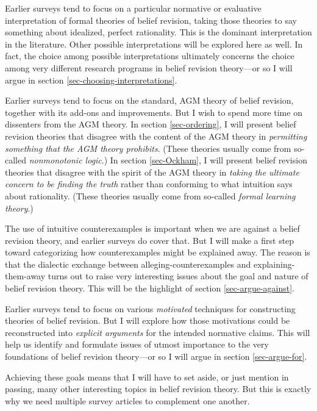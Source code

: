 	\im Earlier surveys tend to focus on a particular normative or evaluative interpretation of formal theories of belief revision, taking those theories to say something about idealized, perfect rationality. This is the dominant interpretation in the literature. Other possible interpretations will be explored here as well. In fact, the choice among possible interpretations ultimately concerns the choice among very different research programs in belief revision theory---or so I will argue in section \ref{sec-choosing-interpretations}. 

	\im Earlier surveys tend to focus on the standard, AGM theory of belief revision, together with its add-ons and improvements. But I wish to spend more time on dissenters from the AGM theory. In section \ref{sec-ordering}, I will present belief revision theories that disagree with the content of the AGM theory in {\em permitting something that the AGM theory prohibits}. (These theories usually come from so-called {\em nonmonotonic logic}.) In section \ref{sec-Ockham}, I will present belief revision theories that disagree with the spirit of the AGM theory in {\em taking the ultimate concern to be finding the truth} rather than conforming to what intuition says about rationality. (These theories usually come from so-called {\em formal learning theory}.) 

	\im The use of intuitive counterexamples is important when we are against a belief revision theory, and earlier surveys do cover that. But I will make a first step toward categorizing how counterexamples might be explained away. The reason is that the dialectic exchange between alleging-counterexamples and explaining-them-away turns out to raise very interesting issues about the goal and nature of belief revision theory. This will be the highlight of section \ref{sec-argue-against}.  

	\im Earlier surveys tend to focus on various {\em motivated} techniques for constructing theories of belief revision. But I will explore how those motivations could be reconstructed into {\em explicit arguments} for the intended normative claims. This will help us identify and formulate issues of utmost importance to the very foundations of belief revision theory---or so I will argue in section \ref{sec-argue-for}.

\ed Achieving these goals means that I will have to set aside, or just mention in passing, many other interesting topics in belief revision theory. But this is exactly why we need multiple survey articles to complement one another. 

